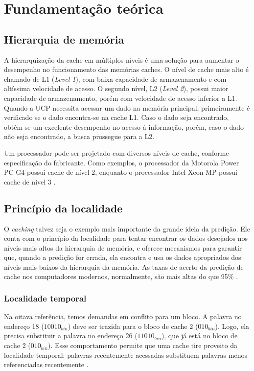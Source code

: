 \chapter{Fundamentação teórica}
\label{cap:fundamentacao}

\section{Hierarquia de memória}
A hierarquização da cache em múltiplos níveis é uma solução para aumentar o desempenho no funcionamento das memórias caches. O nível de cache mais alto é chamado de L1 (\textit{Level 1}), com baixa capacidade de armazenamento e com altíssima velocidade de acesso. O segundo nível, L2 (\textit{Level 2}), possui maior capacidade de armazenamento, porém com velocidade de acesso inferior a L1. Quando a UCP necessita acessar um dado na memória principal, primeiramente é verificado se o dado encontra-se na cache L1. Caso o dado seja encontrado, obtém-se um excelente desempenho no acesso à informação, porém, caso o dado não seja encontrado, a busca prossegue para a L2.

Um processador pode ser projetado com diversos níveis de cache, conforme especificação do fabricante. Como exemplos, o processador da Motorola Power PC G4 possui cache de nível 2, enquanto o processador Intel Xeon MP possui cache de nível 3 \cite{machado2013}.

\section{Princípio da localidade}
O \textit{caching} talvez seja o exemplo mais importante da grande ideia da predição. Ele conta com o princípio da localidade para tentar encontrar os dados desejados nos níveis mais altos da hierarquia de memória, e oferece mecanismos para garantir que, quando a predição for errada, ela encontra e usa os dados apropriados dos níveis mais baixos da hierarquia da memória. As taxas de acerto da predição de cache nos computadores modernos, normalmente, são mais altas do que 95\% \cite{patterson2017}.

\subsection{Localidade temporal}
Na oitava referência, temos demandas em conflito para um bloco. A palavra no endereço 18 (\(10010_{bin}\)) deve ser trazida para o bloco de cache 2 (\(010_{bin}\)). Logo, ela precisa substituir a palavra no endereço 26 (\(11010_{bin}\)), que já está no bloco de cache 2 (\(010_{bin}\)). Esse comportamento permite que uma cache tire proveito da localidade temporal: palavras recentemente acessadas substituem palavras menos referenciadas recentemente \cite{patterson2017}.

